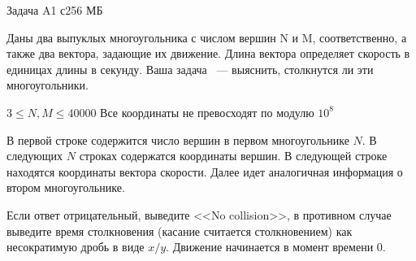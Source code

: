 \begin{problem}{Задача A}{1 с}{256 МБ}

Даны два выпуклых многоугольника с числом вершин N и M, соответственно,
а также два вектора, задающие их движение. Длина вектора определяет скорость
в единицах длины в секунду.
Ваша задача ~--- выяснить, столкнутся ли эти многоугольники.

\Limit

$3 \le N, M \le 40000$
Все координаты не превосходят по модулю $10^8$

\InputFile
В первой строке содержится число вершин в первом многоугольнике $N$.
В следующих $N$ строках содержатся координаты вершин. В следующей строке
находятся координаты вектора скорости. Далее идет аналогичная информация
о втором многоугольнике.

\OutputFile
Если ответ отрицательный, выведите <<No collision>>, в противном случае
выведите время столкновения (касание считается столкновением) как несократимую
дробь в виде $x/y$. Движение начинается в момент времени $0$.

\Example
\begin{example}
\end{example}
\end{problem}
